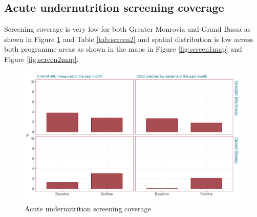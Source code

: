 \documentclass[12pt,a4paper]{article}
\begin{document}
\hypertarget{acute-undernutrition-screening-coverage}{%
\subsection{Acute undernutrition screening coverage}\label{acute-undernutrition-screening-coverage}}

Screening coverage is very low for both Greater Monrovia and Grand Bassa as shown in Figure \ref{fig:screen1} and Table \ref{tab:screen2} and spatial distribution is low across both programme areas as shown in the maps in Figure \ref{fig:screen1map} and Figure \ref{fig:screen2map}.

\begin{figure}[H]

{\centering \includegraphics{liberiaCoverageFinalReport_files/figure-latex/screen1-1} 

}

\caption{Acute undernutrition screening coverage}\label{fig:screen1}
\end{figure}
\end{document}
